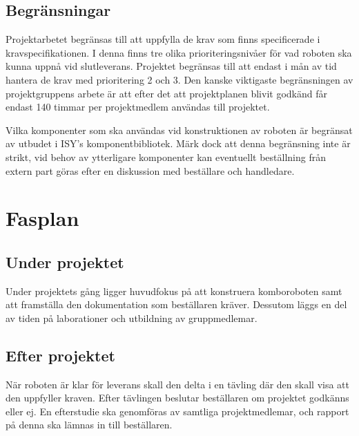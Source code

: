 \documentclass[a4paper,12pt]{article}
\begin{document}
\subsection{Begränsningar}
Projektarbetet begränsas till att uppfylla de krav som finns specificerade i kravspecifikationen. I denna finns tre olika prioriteringsnivåer för vad roboten ska kunna uppnå vid slutleverans. Projektet begränsas till att endast i mån av tid hantera de krav med prioritering 2 och 3.
Den kanske viktigaste begränsningen av projektgruppens arbete är att efter det att projektplanen blivit godkänd får endast 140 timmar per projektmedlem användas till projektet.


Vilka komponenter som ska användas vid konstruktionen av roboten är begränsat av utbudet i ISY's komponentbibliotek. Märk dock att denna begränsning inte är strikt, vid behov av ytterligare komponenter kan eventuellt beställning från extern part göras efter en diskussion med beställare och handledare. 


\section{Fasplan}		

\subsection{Under projektet}
Under projektets gång ligger huvudfokus på att konstruera komboroboten samt att framställa den dokumentation som beställaren kräver. Dessutom läggs en del av tiden på laborationer och utbildning av gruppmedlemar.
\subsection{Efter projektet}
När roboten är klar för leverans skall den delta i en tävling där den skall visa att den uppfyller kraven. Efter tävlingen beslutar beställaren om projektet godkänns eller ej. En efterstudie ska genomföras av samtliga projektmedlemar, och rapport på denna ska lämnas in till beställaren. 
\end{document}
